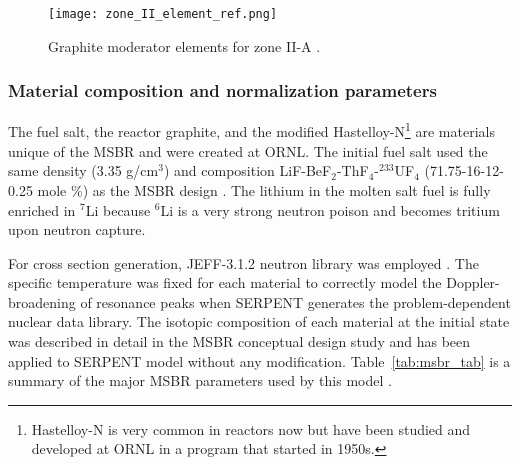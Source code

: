 \begin{figure}[ht!] %
  \centering
  \texttt{[image: zone\_II\_element\_ref.png]}
  \caption{Graphite moderator elements for zone II-A 
\cite{robertson_conceptual_1971,rykhlevskii_full-core_2017}.}
  \label{fig:II_element_ref}
\end{figure}

\subsubsection{Material composition and normalization parameters}
The fuel salt, the reactor graphite, and the modified Hastelloy-N\footnote{ 
Hastelloy-N is very common in reactors now but have been studied and developed 
at \gls{ORNL} in a program that started in 1950s.} are materials unique of the 
\gls{MSBR} and were created at \gls{ORNL}. The initial fuel salt used the same 
density (3.35 g/cm$^3$) and composition LiF-BeF$_2$-ThF$_4$-$^{233}$UF$_4$ 
(71.75-16-12-0.25 mole \%) as the \gls{MSBR} design 
\cite{robertson_conceptual_1971}. The lithium in the molten salt fuel is fully 
enriched in $^{7}$Li because $^{6}$Li is a very strong neutron poison and 
becomes tritium upon neutron capture. 

For cross section generation, JEFF-3.1.2 neutron library was employed 
\cite{oecd/nea_data_bank_jeff-3.1.2_2014}. The specific temperature was fixed 
for each material to correctly model the Doppler-broadening of resonance peaks 
when SERPENT generates the problem-dependent nuclear data library. The isotopic 
composition of each material at the initial state was described in detail in the 
MSBR conceptual design study \cite{robertson_conceptual_1971} and has been 
applied to SERPENT model without any modification. Table~\ref{tab:msbr_tab} is a 
summary of the major \gls{MSBR} parameters used by this model 
\cite{robertson_conceptual_1971}. 

